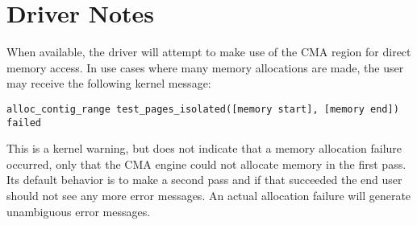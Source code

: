 
\iffalse
This file is protected by Copyright. Please refer to the COPYRIGHT file
distributed with this source distribution.

This file is part of OpenCPI <http://www.opencpi.org>

OpenCPI is free software: you can redistribute it and/or modify it under the
terms of the GNU Lesser General Public License as published by the Free Software
Foundation, either version 3 of the License, or (at your option) any later
version.

OpenCPI is distributed in the hope that it will be useful, but WITHOUT ANY
WARRANTY; without even the implied warranty of MERCHANTABILITY or FITNESS FOR A
PARTICULAR PURPOSE. See the GNU Lesser General Public License for more details.

You should have received a copy of the GNU Lesser General Public License along
with this program. If not, see <http://www.gnu.org/licenses/>.
\fi

\newlength{\savedparindentdrvr}%
\setlength{\savedparindentdrvr}{\parindent}%
\setlength{\parindent}{0pt} %
\providecommand{\forceindent}{\leavevmode{\parindent=1em\indent}}%

\section{Driver Notes}
When available, the driver will attempt to make use of the CMA region for direct memory access. In use cases where many memory allocations are made, the user may receive the following kernel message:

\begin{verbatim}
alloc_contig_range test_pages_isolated([memory start], [memory end]) failed
\end{verbatim}

This is a kernel warning, but does not indicate that a memory allocation failure occurred, only that the CMA engine could not allocate memory in the first pass. Its default behavior is to make a second pass and if that succeeded the end user should not see any more error messages. An actual allocation failure will generate unambiguous error messages.

\setlength{\parindent}{\savedparindentdrvr}%

